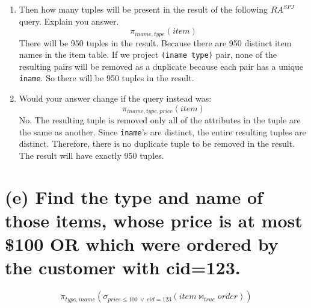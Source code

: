 \documentclass{article}
\begin{document}
\begin{enumerate}
\item  Then how many tuples will be present in the result of the following \(RA^{SPJ}\) query. Explain you answer.
\[
\pi_{iname, type}(item)
\]
There will be 950 tuples in the result. Because there are 950 distinct item names in the item table. If we project \texttt{(iname type)} pair, none of the resulting pairs will be removed as a duplicate because each pair has a unique \texttt{iname}. So there will be 950 tuples in the result.

\item Would your answer change if the query instead was:
\[
\pi_{iname, type, price}(item)
\]
No. The resulting tuple is removed only all of the attributes in the tuple are the same as another. Since \texttt{iname}'s are distinct, the entire resulting tuples are distinct. Therefore, there is no duplicate tuple to be removed in the result. The result will have exactly 950 tuples.

\end{enumerate}

\section{(e) Find the type and name of those items, whose price is at most \$100 OR which were ordered
by the customer with cid=123.}

\[
\pi_{type, iname}(\sigma_{price \leq 100 \ \vee \  cid=123}(item \bowtie_{true} order))
\]
\\
\end{document}
